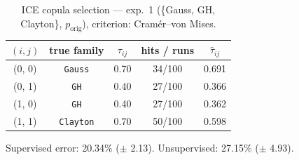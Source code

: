 \begin{table}[htbp]
  \centering
  \caption{ICE copula selection — exp.\ 1 (\{Gauss, GH, Clayton\}, $p_{\text{orig}}$), criterion: Cram\'er--von Mises.}
  \label{tab:exp3-exp1_orig_p__cvm}
  \begin{tabular}{ccccc}
    \toprule
    $(i, j)$ & true family & $\tau_{ij}$ & hits / runs & $\hat\tau_{ij}$ \\
    \midrule
    (0, 0) & \texttt{Gauss} & 0.70 & 34/100 & 0.691 \\
    (0, 1) & \texttt{GH} & 0.40 & 27/100 & 0.366 \\
    (1, 0) & \texttt{GH} & 0.40 & 27/100 & 0.362 \\
    (1, 1) & \texttt{Clayton} & 0.70 & 50/100 & 0.598 \\
    \bottomrule
  \end{tabular}
  \par\smallskip Supervised error: 20.34\% ($\pm$ 2.13). Unsupervised: 27.15\% ($\pm$ 4.93).
\end{table}
